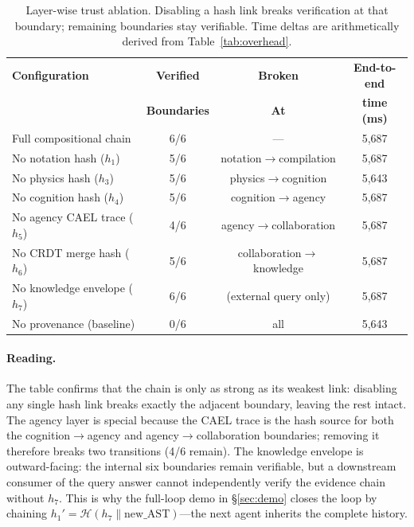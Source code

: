 \documentclass[sigchi-a]{acmart}
\newcommand{\hashfn}{\mathcal{H}}
\begin{document}
\begin{table}[t]
  \centering
  \caption{Layer-wise trust ablation.  Disabling a hash link breaks
    verification at that boundary; remaining boundaries stay
    verifiable.  Time deltas are arithmetically derived from
    Table~\ref{tab:overhead}.}
  \label{tab:capstone-ablation}
  \small
  \begin{tabular}{@{}lccc@{}}
    \toprule
    \textbf{Configuration} & \textbf{Verified} & \textbf{Broken} & \textbf{End-to-end} \\
     & \textbf{Boundaries} & \textbf{At} & \textbf{time (ms)} \\
    \midrule
    Full compositional chain & 6/6 & --- & 5{,}687 \\
    No notation hash ($h_1$) & 5/6 & notation$\to$compilation & 5{,}687 \\
    No physics hash ($h_3$) & 5/6 & physics$\to$cognition & 5{,}643 \\
    No cognition hash ($h_4$) & 5/6 & cognition$\to$agency & 5{,}687 \\
    No agency CAEL trace ($h_5$) & 4/6 & agency$\to$collaboration & 5{,}687 \\
    No CRDT merge hash ($h_6$) & 5/6 & collaboration$\to$knowledge & 5{,}687 \\
    No knowledge envelope ($h_7$) & 6/6 & (external query only) & 5{,}687 \\
    No provenance (baseline) & 0/6 & all & 5{,}643 \\
    \bottomrule
  \end{tabular}
\end{table}

\paragraph{Reading.}
The table confirms that the chain is only as strong as its weakest
link: disabling any single hash link breaks exactly the adjacent
boundary, leaving the rest intact.  The agency layer is special because
the CAEL trace is the hash source for both the cognition$\to$agency
and agency$\to$collaboration boundaries; removing it therefore breaks
two transitions (4/6 remain).  The knowledge envelope is outward-facing:
the internal six boundaries remain verifiable, but a downstream
consumer of the query answer cannot independently verify the evidence
chain without $h_7$.  This is why the full-loop demo in
\S\ref{sec:demo} closes the loop by chaining
$h_1' = \hashfn(h_7 \| \text{new\_AST})$---the next agent inherits the
complete history.
\end{document}
